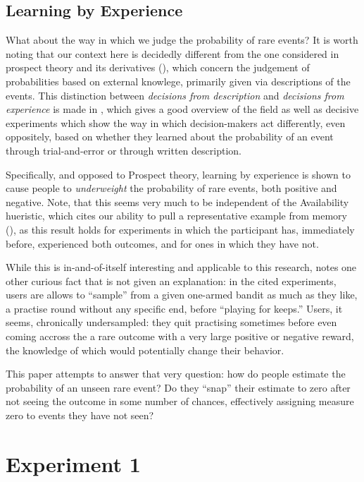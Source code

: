 \documentclass[a4paper,12pt]{article}
\begin{document}
\subsection{Learning by Experience}

What about the way in which we judge the probability of rare events? It is worth noting that our context here is decidedly different from the one considered in prospect theory and its derivatives (\cite{kahneman1979}), which concern the judgement of probabilities based on external knowlege, primarily given via descriptions of the events. This distinction between \textit{decisions from description} and \textit{decisions from experience} is made in \cite{hertwig2004}, which gives a good overview of the field as well as decisive experiments which show the way in which decision-makers act differently, even oppositely, based on whether they learned about the probability of an event through trial-and-error or through written description.

Specifically, and opposed to Prospect theory, learning by experience is shown to cause people to \textit{underweight} the probability of rare events, both positive and negative. Note, that this seems very much to be independent of the Availability hueristic, which cites our ability to pull a representative example from memory (\cite{tversky1973}), as this result holds for experiments in which the participant has, immediately before, experienced both outcomes, and for ones in which they have not.

While this is in-and-of-itself interesting and applicable to this research, \cite{hertwig2004} notes one other curious fact that is not given an explanation: in the cited experiments, users are allows to ``sample'' from a given one-armed bandit as much as they like, a practise round without any specific end, before ``playing for keeps.'' Users, it seems, chronically undersampled: they quit practising sometimes before even coming accross the a rare outcome with a very large positive or negative reward, the knowledge of which would potentially change their behavior. 

This paper attempts to answer that very question: how do people estimate the probability of an unseen rare event? Do they ``snap'' their estimate to zero after not seeing the outcome in some number of chances, effectively assigning measure zero to events they have not seen?

\section{Experiment 1}
\end{document}
